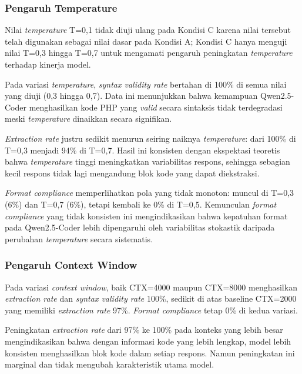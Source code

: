 \subsubsection{Pengaruh Temperature}

Nilai \textit{temperature} T=0,1 tidak diuji ulang pada Kondisi C
karena nilai tersebut telah digunakan sebagai nilai dasar pada
Kondisi A; Kondisi C hanya menguji nilai T=0,3 hingga T=0,7
untuk mengamati pengaruh peningkatan \textit{temperature}
terhadap kinerja model.

Pada variasi \textit{temperature}, \textit{syntax validity rate}
bertahan di 100\% di semua nilai yang diuji (0,3 hingga 0,7). 
Data ini menunjukkan bahwa kemampuan Qwen2.5-Coder menghasilkan kode 
PHP yang \textit{valid} secara sintaksis tidak terdegradasi meski 
\textit{temperature} dinaikkan secara signifikan.

\textit{Extraction rate} justru sedikit menurun seiring naiknya 
\textit{temperature}: dari 100\% di T=0,3 menjadi 94\% di T=0,7. 
Hasil ini konsisten dengan ekspektasi teoretis bahwa \textit{temperature} 
tinggi meningkatkan variabilitas respons, sehingga sebagian kecil 
respons tidak lagi mengandung blok kode yang dapat diekstraksi.

\textit{Format compliance} memperlihatkan pola yang tidak monoton: 
muncul di T=0,3 (6\%) dan T=0,7 (6\%), tetapi kembali ke 0\% di 
T=0,5. Kemunculan \textit{format compliance} yang tidak konsisten 
ini mengindikasikan bahwa kepatuhan format pada Qwen2.5-Coder 
lebih dipengaruhi oleh variabilitas stokastik daripada perubahan 
\textit{temperature} secara sistematis.

\subsubsection{Pengaruh Context Window}

Pada variasi \textit{context window}, baik CTX=4000 maupun 
CTX=8000 menghasilkan \textit{extraction rate} dan 
\textit{syntax validity rate} 100\%, sedikit di atas baseline 
CTX=2000 yang memiliki \textit{extraction rate} 97\%. 
\textit{Format compliance} tetap 0\% di kedua variasi.

Peningkatan \textit{extraction rate} dari 97\% ke 100\% pada 
konteks yang lebih besar mengindikasikan bahwa dengan informasi 
kode yang lebih lengkap, model lebih konsisten menghasilkan blok 
kode dalam setiap respons. Namun peningkatan ini marginal dan 
tidak mengubah karakteristik utama model.

